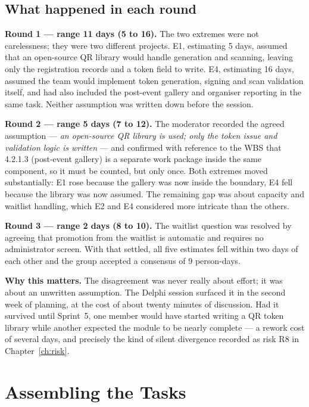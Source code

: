 \documentclass[11pt,a4paper]{report}
\begin{document}
\subsection*{What happened in each round}

\textbf{Round 1 --- range 11 days (5 to 16).} The two extremes were not
carelessness; they were two different projects. E1, estimating 5 days, assumed
that an open-source QR library would handle generation and scanning, leaving only
the registration records and a token field to write. E4, estimating 16 days,
assumed the team would implement token generation, signing and scan validation
itself, and had also included the post-event gallery and organiser reporting in
the same task. Neither assumption was written down before the session.

\medskip
\textbf{Round 2 --- range 5 days (7 to 12).} The moderator recorded the agreed
assumption --- \emph{an open-source QR library is used; only the token issue and
validation logic is written} --- and confirmed with reference to the WBS that
4.2.1.3 (post-event gallery) is a separate work package inside the same
component, so it must be counted, but only once. Both extremes moved
substantially: E1 rose because the gallery was now inside the boundary, E4 fell
because the library was now assumed. The remaining gap was about capacity and
waitlist handling, which E2 and E4 considered more intricate than the others.

\medskip
\textbf{Round 3 --- range 2 days (8 to 10).} The waitlist question was resolved by
agreeing that promotion from the waitlist is automatic and requires no
administrator screen. With that settled, all five estimates fell within two days
of each other and the group accepted a consensus of 9 person-days.

\begin{keybox}
\textbf{Why this matters.} The disagreement was never really about effort; it was
about an unwritten assumption. The Delphi session surfaced it in the second week
of planning, at the cost of about twenty minutes of discussion. Had it survived
until Sprint~5, one member would have started writing a QR token library while
another expected the module to be nearly complete --- a rework cost of several
days, and precisely the kind of silent divergence recorded as risk R8 in
Chapter~\ref{ch:risk}.
\end{keybox}


\section{Assembling the Tasks}
\end{document}
